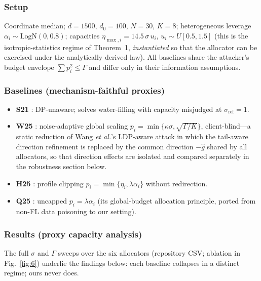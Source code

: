 \documentclass[final,1p,times]{elsarticle}
\newcommand{\etal}{\emph{et al.}}
\begin{document}
\subsubsection{Setup}
Coordinate median; $d{=}1500$, $d_0{=}100$, $N{=}30$, $K{=}8$;
heterogeneous leverage $\alpha_i\sim\mathrm{LogN}(0,0.8)$; capacities
$\eta_{\max,i}=14.5\,\sigma\, u_i$, $u_i\sim U[0.5,1.5]$ (this is the
isotropic-statistics regime of Theorem~1, \emph{instantiated}
so that the allocator can be exercised under the analytically derived
law). All baselines share
the attacker's budget envelope $\sum p_i^2\le\Gamma$ and differ only in
their information assumptions.

\subsubsection{Baselines (mechanism-faithful proxies)}
\begin{itemize}
  \item \textbf{S21} \cite{shejwalkar2021turning}: DP-unaware; solves
  water-filling with capacity misjudged at $\sigma_{\mathrm{ref}}{=}1$.
  \item \textbf{W25} \cite{wang2025ldpfl}: noise-adaptive global
  scaling $p_i=\min\{\kappa\sigma,\sqrt{\Gamma/K}\}$, client-blind---a
  static reduction of Wang \etal's LDP-aware attack in which the
  tail-aware direction refinement is replaced by the common direction
  $-\hat g$ shared by all allocators, so that direction effects are
  isolated and compared separately in the robustness section below.
  \item \textbf{H25} \cite{hossain2025mpelm}: profile clipping
  $p_i=\min\{\eta_i,\lambda\alpha_i\}$ without redirection.
  \item \textbf{Q25} \cite{qiu2025budget}: uncapped
  $p_i=\lambda\alpha_i$ (its global-budget allocation principle,
  ported from non-FL data poisoning to our setting).
\end{itemize}

\subsubsection{Results (proxy capacity analysis)}
The full $\sigma$ and $\Gamma$ sweeps over the six allocators
(repository CSV; ablation in Fig.~\ref{fig:6}) underlie the findings
below: each baseline collapses in a distinct regime; ours never does.
\end{document}
